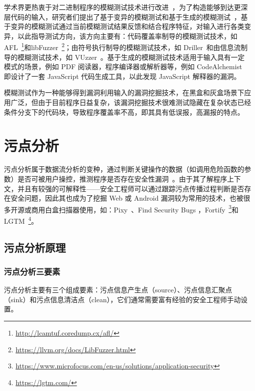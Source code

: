 学术界更热衷于对二进制程序的模糊测试技术进行改进~\cite{artoffuzz}，为了构造能够到达更深层代码的输入，研究者们提出了基于变异的模糊测试和基于生成的模糊测试~\cite{Zou2018}，基于变异的模糊测试通过当前模糊测试结果反馈和结合程序特征，对输入进行各类变异，以此指导测试方向，该方向主要有：代码覆盖率制导的模糊测试技术，如 AFL~\footnote{\url{http://lcamtuf.coredump.cx/afl/}}和libFuzzer~\footnote{\url{https://llvm.org/docs/LibFuzzer.html}}；由符号执行制导的模糊测试技术，如 Driller~\cite{Driller}和由信息流制导的模糊测试技术，如 VUzzer~\cite{VUzzer}。基于生成的模糊测试技术适用于输入具有一定模式的场景，例如 PDF 阅读器，程序编译器或解析器等，例如 CodeAlchemist~\cite{CodeAlchemist} 即设计了一套 JavaScript 代码生成工具，以此发现 JavaScript 解释器的漏洞。

模糊测试作为一种能够得到漏洞利用输入的漏洞挖掘技术，在黑盒和灰盒场景下应用广泛，但由于目前程序日益复杂，该漏洞挖掘技术很难测试隐藏在复杂状态已经条件分支下的代码块，导致程序覆盖率不高，即其具有低误报，高漏报的特点。

\section{污点分析}
污点分析属于数据流分析的变种，通过判断关键操作的数据（如调用危险函数的参数）是否可被用户操控，推测程序是否存在安全性漏洞~\cite{taint:wanglei}。由于其了解程序上下文，并且有较强的可解释性——安全工程师可以通过跟踪污点传播过程判断是否存在安全问题，因此其也成为了挖掘 Web 或 Android 漏洞较为常用的技术，也被很多开源或商用白盒扫描器使用，如：Pixy~\cite{pixy}、Find Security Bugs ，Fortify~\footnote{\url{https://www.microfocus.com/en-us/solutions/application-security}}和LGTM~\footnote{\url{https://lgtm.com/}}。

\subsection{污点分析原理}

\subsubsection{污点分析三要素}
污点分析主要有三个组成要素：污点信息产生点（source）、污点信息汇聚点（sink）和污点信息清洁点（clean），它们通常需要富有经验的安全工程师手动设置。

